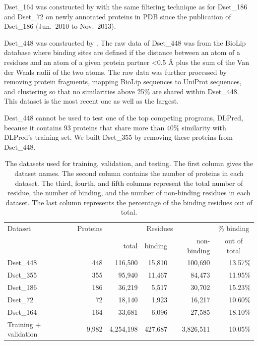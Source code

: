Dset\_164 was constructed by \cite{dhole2014sequence} with the same filtering technique as for Dset\_186 and Dset\_72 on newly annotated proteins in PDB since the publication of Dset\_186 (Jun.~2010 to Nov.~2013). 

Dset\_448 was constructed by \cite{zhang2019scriber}. The raw data of Dset\_448 was from the BioLip database \cite{yang2012biolip} where binding sites are defined if the distance between an atom of a residues and an atom of a given protein partner <0.5 \AA{} plus the sum of the Van der Waals radii of the two atoms. The raw data was further processed by removing protein fragments, mapping BioLip sequences to UniProt sequences, and clustering so that no similarities above 25\% are shared within Dset\_448. This dataset is the most recent one as well as the largest. 

Dest\_448 cannot be used to test one of the top competing programs, DLPred, because it contains 93 proteins that share more than 40\% similarity with DLPred's training set. We built Dset\_355 by removing these proteins from Dset\_448.

\begin{table}[htbp]
    \centering
    \caption[The datasets used for training, validation, and testing]{The datasets used for training, validation, and testing. The first column gives the dataset names. The second column contains the number of proteins in each dataset. The third, fourth, and fifth columns represent the total number of residue, the number of binding, and the number of non-binding residues in each dataset. The last column represents the percentage of the binding residues out of total.}
    \begin{tabular}{p{12em}rrrrr}
    \toprule
    Dataset & Proteins & \multicolumn{3}{c}{Residues} & \multicolumn{1}{c}{\% binding} \\ \cline{3-5}
    & & total & binding & non-binding & \multicolumn{1}{c}{out of total}\\ \hline
    Dset\_448 & 448   & 116,500 & 15,810 & 100,690 & 13.57\% \\
    Dset\_355 & 355   & 95,940 & 11,467 & 84,473 & 11.95\% \\
    Dset\_186 & 186   & 36,219 & 5,517 & 30,702 & 15.23\% \\
    Dset\_72 & 72    & 18,140 & 1,923 & 16,217 & 10.60\% \\
    Dset\_164 & 164   & 33,681 & 6,096 & 27,585 & 18.10\% \\
    Training + validation & 9,982 & 4,254,198 & 427,687 & 3,826,511 & 10.05\% \\
    \hline
    \end{tabular}%
    \label{tab_dataset}%
\end{table}%

